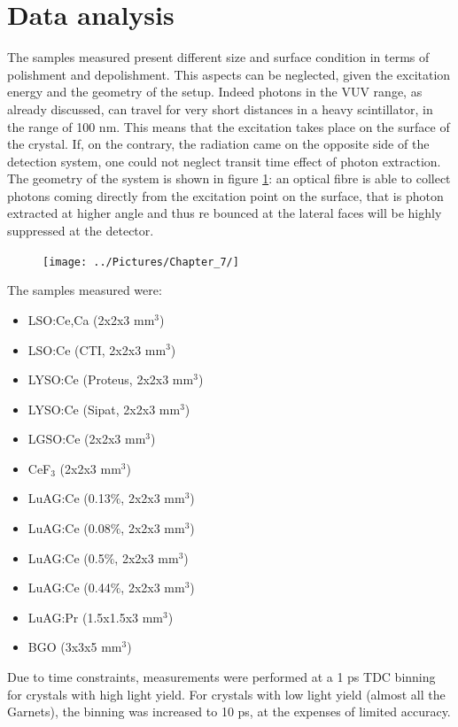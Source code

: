 \section{Data analysis}
The samples measured present different size and surface condition in terms of polishment and depolishment.
This aspects can be neglected, given the excitation energy and the geometry of the setup.
Indeed photons in the VUV range, as already discussed, can travel for very short distances in a heavy scintillator, in the range of 100 nm. This means that the excitation takes place on the surface of the crystal. If, on the contrary, the radiation came on the opposite side of the detection system, one could not neglect transit time effect of photon extraction. The geometry of the system is shown in figure \ref{fig:geom}: an optical fibre is able to collect photons coming directly from the excitation point on the surface, that is photon extracted at higher angle and thus re bounced at the lateral faces will be highly suppressed at the detector.
\begin{figure}[htbp]
\begin{center}
\texttt{[image: ../Pictures/Chapter\_7/]}
\end{center}
\caption[]{}
\label{fig:geom}
\end{figure}
The samples measured were:
\begin{itemize}
\item LSO:Ce,Ca (2x2x3 mm$^{3}$) 
\item LSO:Ce (CTI, 2x2x3 mm$^{3}$)
\item LYSO:Ce (Proteus, 2x2x3 mm$^{3}$)
\item LYSO:Ce (Sipat, 2x2x3 mm$^{3}$)
\item LGSO:Ce (2x2x3 mm$^{3}$)
\item CeF$_{3}$ (2x2x3 mm$^{3}$)
\item LuAG:Ce (0.13$\%$, 2x2x3 mm$^{3}$)
\item LuAG:Ce (0.08$\%$, 2x2x3 mm$^{3}$)
\item LuAG:Ce (0.5$\%$, 2x2x3 mm$^{3}$) 
\item LuAG:Ce (0.44$\%$, 2x2x3 mm$^{3}$)
\item LuAG:Pr (1.5x1.5x3 mm$^{3}$)
\item BGO (3x3x5 mm$^{3}$)
\end{itemize}
Due to time constraints, measurements were performed at a 1 ps TDC binning for crystals with high light yield. For crystals with low light yield (almost all the Garnets), the binning was increased to 10 ps, at the expenses of limited accuracy.
